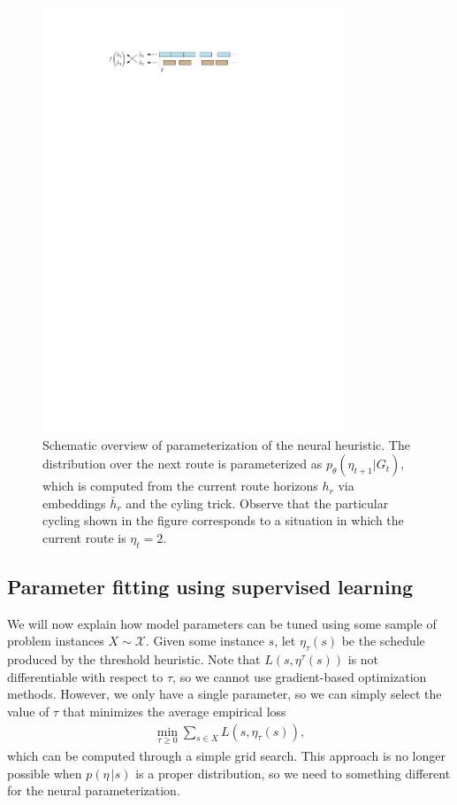 \documentclass[a4paper]{report}
\theoremstyle{definition}
\theoremstyle{plain}
\begin{document}
\begin{figure}
  \centering
  \includegraphics[width=0.8\textwidth]{figures/single/embedding}
  \caption{Schematic overview of parameterization of the neural heuristic. The
    distribution over the next route is parameterized as
    $p_{\theta}(\eta_{t+1} | G_{t})$, which is computed from the current route horizons
    $h_{r}$ via embeddings $\bar{h}_{r}$ and the cyling trick. Observe that the
    particular cycling shown in the figure corresponds to a situation in which
    the current route is $\eta_{t} = 2$.}\label{fig:neural_embedding}
\end{figure}


\subsection{Parameter fitting using supervised learning}

We will now explain how model parameters can be tuned using some sample of
problem instances $X \sim \mathcal{X}$.
%
Given some instance $s$, let $\eta_{\tau}(s)$ be the schedule produced by the
threshold heuristic. Note that $L(s, \eta^{\tau}(s))$ is not differentiable with
respect to $\tau$, so we cannot use gradient-based optimization methods.
However, we only have a single parameter, so we can simply select the value of
$\tau$ that minimizes the average empirical loss
%
\begin{align*}
  \min_{\tau \geq 0} \sum_{s \in X} L(s, \eta_{\tau}(s)) ,
\end{align*}
%
which can be computed through a simple grid search.
%
This approach is no longer possible when $p(\eta \, | s)$ is a proper distribution,
so we need to something different for the neural parameterization.
\end{document}

